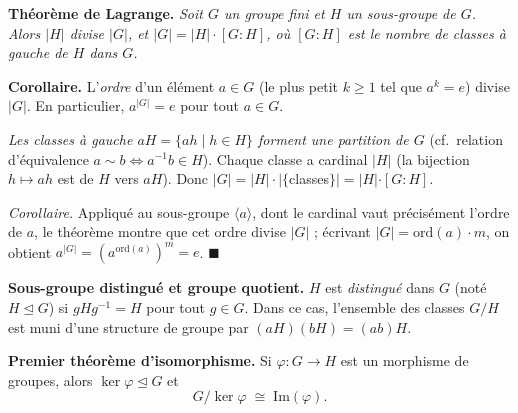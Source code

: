 \decsep{}


\begin{tcolorbox}[thmbox]
  \textbf{Théorème de Lagrange.}\enspace%
  \textit{Soit $G$ un groupe fini et $H$ un sous-groupe de $G$. Alors
  $|H|$ divise $|G|$, et $|G| = |H| \cdot [G:H]$, où $[G:H]$ est le
  nombre de classes à gauche de $H$ dans $G$.}

  \medskip
  \textbf{Corollaire.}\enspace%
  L'\emph{ordre} d'un élément $a \in G$
  (le plus petit $k \geq 1$ tel que $a^k = e$) divise $|G|$.
  En particulier, $a^{|G|} = e$ pour tout $a \in G$.
\end{tcolorbox}

\begin{mdframed}[style=proofbar]
  \textit{Les classes à gauche $aH = \{ah \mid h \in H\}$ forment une partition de $G$}
  (cf.\ relation d'équivalence $a \sim b \Leftrightarrow a^{-1}b \in H$).
  Chaque classe a cardinal $|H|$ (la bijection $h \mapsto ah$ est de $H$ vers $aH$).
  Donc $|G| = |H| \cdot |\{$classes$\}| = |H| \cdot [G:H]$.

  \textit{Corollaire.} Appliqué au sous-groupe $\langle a\rangle$, dont le cardinal
  vaut précisément l'ordre de $a$, le théorème montre que cet ordre divise $|G|$ ;
  écrivant $|G| = \mathrm{ord}(a)\cdot m$, on obtient $a^{|G|} = (a^{\mathrm{ord}(a)})^m = e$.
  \hfill$\blacksquare$
\end{mdframed}

\begin{tcolorbox}[thmbox]
  \textbf{Sous-groupe distingué et groupe quotient.}\enspace%
  $H$ est \emph{distingué} dans $G$ (noté $H \trianglelefteq G$) si
  $gHg^{-1} = H$ pour tout $g \in G$.
  Dans ce cas, l'ensemble des classes $G/H$ est muni d'une structure de groupe
  par $(aH)(bH) = (ab)H$.

  \medskip
  \textbf{Premier théorème d'isomorphisme.}\enspace%
  Si $\varphi : G \to H$ est un morphisme de groupes, alors $\ker\varphi \trianglelefteq G$
  et
  \[
    G/\ker\varphi \;\cong\; \mathrm{Im}(\varphi).
  \]
\end{tcolorbox}

